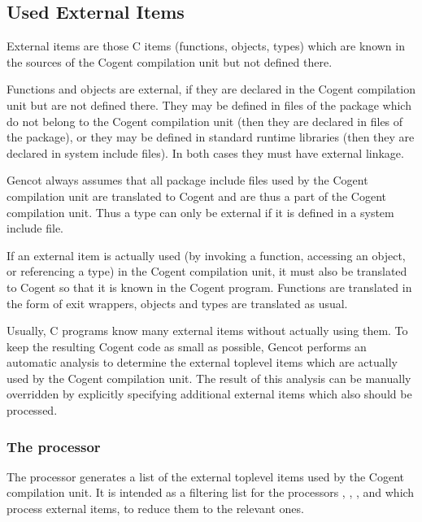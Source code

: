 \subsection{Used External Items}
\label{impl-ccomps-items}

External items are those C items (functions, objects, types) which are known in the sources of the Cogent compilation
unit but not defined there. 

Functions and objects are external, if they are declared in the 
Cogent compilation unit but are not defined there. They may be defined in files of the package which do not belong to
the Cogent compilation unit (then they are declared in  files of the package), or they may be defined in 
standard runtime libraries (then they are declared in system include files). In both cases they must have external linkage.

Gencot always assumes that all package include files used by the Cogent compilation unit are translated to Cogent and
are thus a part of the Cogent compilation unit. Thus a type can only be external if it is defined in a system include
file.

If an external item is actually used (by invoking a function, accessing an object, or referencing a type) in the Cogent
compilation unit, it must also be translated to Cogent so that it is known in the Cogent program. Functions are translated
in the form of exit wrappers, objects and types are translated as usual.

Usually, C programs know many external items without actually using them. To keep the resulting Cogent code as small 
as possible, Gencot performs an automatic analysis to determine the external toplevel items which are actually used
by the Cogent compilation unit. The result of this analysis can be manually overridden by explicitly specifying additional
external items which also should be processed.

\subsubsection{The processor }

The processor  generates a list of the external toplevel items used by the Cogent compilation unit.
It is intended as a filtering list for the processors , , ,
 and  which process external items, to reduce them to the relevant ones.

